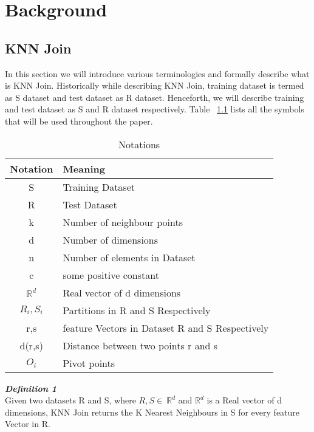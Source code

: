 \chapter{Background} \label{chap:Background}

\section{KNN Join}
In this section we will introduce various terminologies and formally
describe what is KNN Join. Historically while describing KNN Join, training dataset is termed as
S dataset and test dataset as R dataset. Henceforth, we will describe
training and test dataset as S and R dataset
respectively. Table ~\ref{table_notations} lists all the symbols that will be
used throughout the paper.

\begin{table}[!ht]
\caption{Notations}
\label{table_notations}
\centering
\begin{tabular}{|c|l|}
\hline
Notation & Meaning \\
\hline
S & Training Dataset \\

R & Test Dataset\\

k & Number of neighbour points \\

d & Number of dimensions \\

n & Number of elements in Dataset \\

c & some positive constant \\

$\mathbb{R}^d$ & Real vector of d dimensions \\

$R_i, S_i$ & Partitions in R and S Respectively \\

r,s & feature Vectors in Dataset R and S Respectively \\

d(r,s) & Distance between two points r and s \\

$O_i$ & Pivot points \\

\hline
\end{tabular}
\end{table}


\textbf{\emph{Definition 1}} \\
Given two datasets R and S, where $R,S \in\
\mathbb{R}^d$ and $\mathbb{R}^d$ is a Real vector of d dimensions, KNN Join returns the K
Nearest Neighbours in S for every feature Vector in R.

